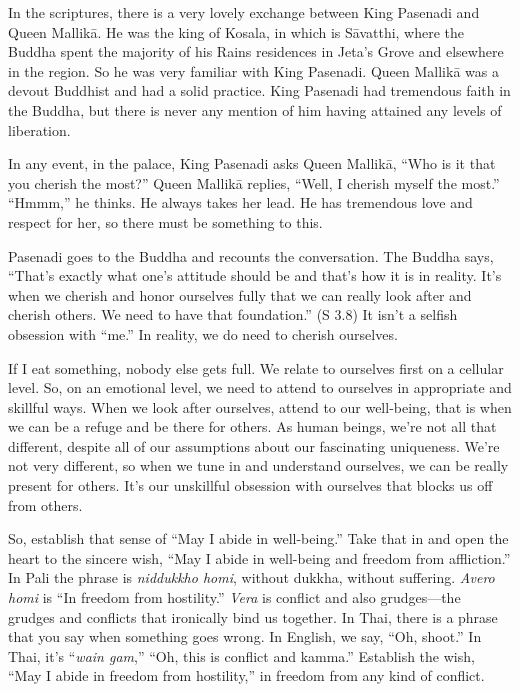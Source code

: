 In the scriptures, there is a very lovely exchange between King Pasenadi
and Queen Mallikā. He was the king of Kosala, in which is Sāvatthi,
where the Buddha spent the majority of his Rains residences in Jeta’s
Grove and elsewhere in the region. So he was very familiar with King
Pasenadi. Queen Mallikā was a devout Buddhist and had a solid practice.
King Pasenadi had tremendous faith in the Buddha, but there is never any
mention of him having attained any levels of liberation.

In any event, in the palace, King Pasenadi asks Queen Mallikā, “Who is
it that you cherish the most?” Queen Mallikā replies, “Well, I cherish
myself the most.” “Hmmm,” he thinks. He always takes her lead. He has
tremendous love and respect for her, so there must be something to this.

Pasenadi goes to the Buddha and recounts the conversation. The Buddha
says, “That’s exactly what one’s attitude should be and that’s how it is
in reality. It’s when we cherish and honor ourselves fully that we can
really look after and cherish others. We need to have that foundation.”
(S 3.8) It isn’t a selfish obsession with “me.” In reality, we do need
to cherish ourselves.

If I eat something, nobody else gets full. We relate to ourselves first
on a cellular level. So, on an emotional level, we need to attend to
ourselves in appropriate and skillful ways. When we look after
ourselves, attend to our well-being, that is when we can be a refuge and
be there for others. As human beings, we’re not all that different,
despite all of our assumptions about our fascinating uniqueness. We’re
not very different, so when we tune in and understand ourselves, we can
be really present for others. It’s our unskillful obsession with
ourselves that blocks us off from others.

So, establish that sense of “May I abide in well-being.” Take that in
and open the heart to the sincere wish, “May I abide in well-being and
freedom from affliction.” In Pali the phrase is \emph{niddukkho homi},
without dukkha, without suffering. \emph{Avero homi} is “In freedom from
hostility.” \emph{Vera} is conflict and also grudges—the grudges and
conflicts that ironically bind us together. In Thai, there is a phrase
that you say when something goes wrong. In English, we say, “Oh, shoot.”
In Thai, it’s “\emph{wain gam},” “Oh, this is conflict and kamma.”
Establish the wish, “May I abide in freedom from hostility,” in freedom
from any kind of conflict.

